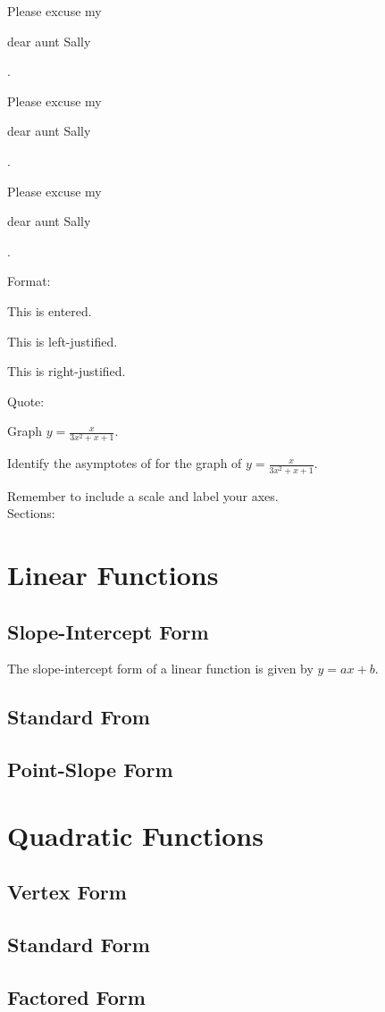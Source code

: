 \documentclass[11pt]{article}
\def\eq1{y=\frac{x}{3x^2+x+1}}
\def\labelaxes{Remember to include a scale and label your axes.}
\begin{document}
Please excuse my \begin{Huge}dear aunt Sally\end{Huge}.

Please excuse my \begin{small}dear aunt Sally\end{small}.

Please excuse my \begin{tiny}dear aunt Sally\end{tiny}.

Format:

\begin{center}This is entered.\end{center}
\begin{flushleft}This is left-justified.\end{flushleft}
\begin{flushright}This is right-justified.\end{flushright}

Quote:

Graph $\eq1$.

Identify the asymptotes of for the graph of $\eq1$. 

\labelaxes\\

Sections:

\section{Linear Functions}
	\subsection{Slope-Intercept Form}
	The slope-intercept form of a linear function is given by $y=ax+b$.
	\subsection{Standard From}
	\subsection{Point-Slope Form}
\section{Quadratic Functions}
	\subsection{Vertex Form}
	\subsection{Standard Form}
	\subsection{Factored Form}
\end{document}
